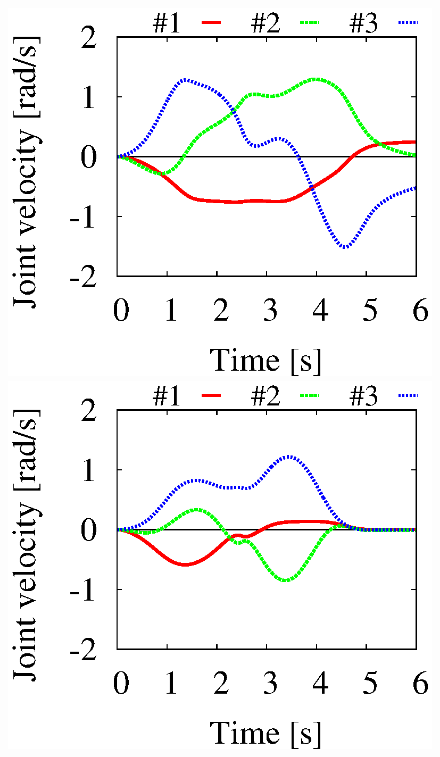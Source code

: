 %
\begin{figure}[t]
  \centering
  \begin{minipage}{0.327\linewidth}
    \centering
    \includegraphics[width=1.0\linewidth]{fig/chapter7/mass/planar/10.eps}
  \end{minipage}
  \begin{minipage}{0.327\linewidth}
    \centering
    \includegraphics[width=1.0\linewidth]{fig/chapter7/mass/planar/100.eps}

\end{minipage}
\end{figure}
